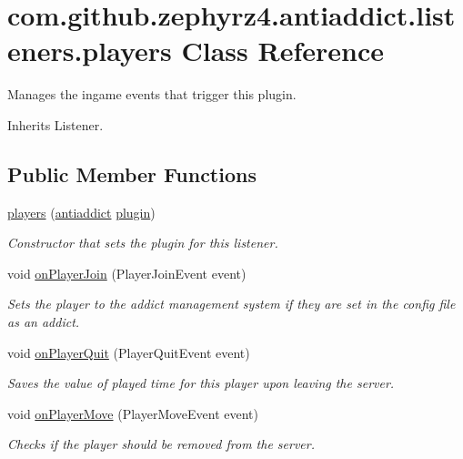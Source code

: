 \hypertarget{classcom_1_1github_1_1zephyrz4_1_1antiaddict_1_1listeners_1_1players}{\section{com.\-github.\-zephyrz4.\-antiaddict.\-listeners.\-players \-Class \-Reference}
\label{classcom_1_1github_1_1zephyrz4_1_1antiaddict_1_1listeners_1_1players}
}


\-Manages the ingame events that trigger this plugin.  




\-Inherits \-Listener.

\subsection*{\-Public \-Member \-Functions}
\begin{DoxyCompactItemize}
\item 
\hyperlink{classcom_1_1github_1_1zephyrz4_1_1antiaddict_1_1listeners_1_1players_ad96e19b9b6851867b6580ae1b870e237}{players} (\hyperlink{classcom_1_1github_1_1zephyrz4_1_1antiaddict_1_1antiaddict}{antiaddict} \hyperlink{classcom_1_1github_1_1zephyrz4_1_1antiaddict_1_1listeners_1_1players_aff372496fd4a51243587dfa9fdad87de}{plugin})
\begin{DoxyCompactList}\small\item\em \-Constructor that sets the plugin for this listener. \end{DoxyCompactList}\item 
void \hyperlink{classcom_1_1github_1_1zephyrz4_1_1antiaddict_1_1listeners_1_1players_ab2e77dc46e96d299fe0c8a9f582894ec}{on\-Player\-Join} (\-Player\-Join\-Event event)
\begin{DoxyCompactList}\small\item\em \-Sets the player to the addict management system if they are set in the config file as an addict. \end{DoxyCompactList}\item 
void \hyperlink{classcom_1_1github_1_1zephyrz4_1_1antiaddict_1_1listeners_1_1players_aa1edaedbf6ee7f3e8d3dfcee1fd7fb64}{on\-Player\-Quit} (\-Player\-Quit\-Event event)
\begin{DoxyCompactList}\small\item\em \-Saves the value of played time for this player upon leaving the server. \end{DoxyCompactList}\item 
void \hyperlink{classcom_1_1github_1_1zephyrz4_1_1antiaddict_1_1listeners_1_1players_a75aefd4e3da145dc69e29a0a83af6fda}{on\-Player\-Move} (\-Player\-Move\-Event event)
\begin{DoxyCompactList}\small\item\em \-Checks if the player should be removed from the server. \end{DoxyCompactList}\end{DoxyCompactItemize}
